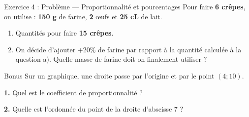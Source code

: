 \begin{problembox}{ Exercice 4 : Problème — Proportionnalité et pourcentages }
	Pour faire \textbf{6 crêpes}, on utilise : \textbf{150 g} de farine, \textbf{2} œufs et \textbf{25 cL} de lait.
	
	\begin{enumerate}[label=\textcolor{primary}{\textbf{\alph*)}},leftmargin=*]
		\item Quantités pour faire \textbf{15 crêpes}. 
		
		
		\item On décide d'ajouter \(+20\%\) de farine par rapport à la quantité calculée à la question a). Quelle masse de farine doit-on finalement utiliser ? 
		
	\end{enumerate}
\end{problembox}

\exspace

\begin{exercisebox}{ Bonus }
	Sur un graphique, une droite passe par l'origine et par le point \((4 ; 10)\).
	
	\smallspace
	
	\textbf{1.} Quel est le coefficient de proportionnalité ? 
	
	
	\textbf{2.} Quelle est l'ordonnée du point de la droite d'abscisse 7 ? 
	
\end{exercisebox}
